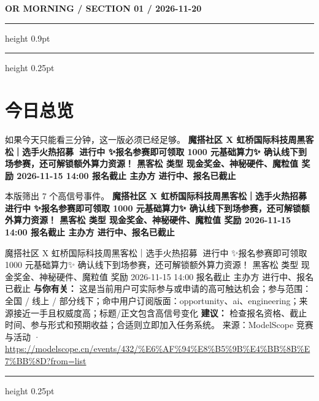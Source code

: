 \documentclass[10.5pt]{ctexart}
\begin{document}
{\small\bfseries OR MORNING / SECTION 01 / 2026-11-20}
\vspace{2mm}
\hrule height 0.9pt
\vspace{1.5mm}
\hrule height 0.25pt
\vspace{4mm}
\section*{今日总览}
{\color{ormuted} 如果今天只能看三分钟，这一版必须已经足够。}
\vspace{2mm}
{\fontsize{25}{29}\selectfont\bfseries 魔搭社区 X 虹桥国际科技周黑客松｜选手火热招募🚀 进行中 ✨报名参赛即可领取 1000 元基础算力✨ 确认线下到场参赛，还可解锁额外算力资源！ 黑客松 类型 现金奖金、神秘硬件、魔粒值 奖励 2026-11-15 14:00 报名截止 主办方 进行中、报名已截止}\par
\vspace{2mm}
{\large 本版筛出 7 个高信号事件。}
\vspace{3mm}
{\Large\bfseries 魔搭社区 X 虹桥国际科技周黑客松｜选手火热招募🚀 进行中 ✨报名参赛即可领取 1000 元基础算力✨ 确认线下到场参赛，还可解锁额外算力资源！ 黑客松 类型 现金奖金、神秘硬件、魔粒值 奖励 2026-11-15 14:00 报名截止 主办方 进行中、报名已截止}\par
魔搭社区 X 虹桥国际科技周黑客松｜选手火热招募🚀 进行中 ✨报名参赛即可领取 1000 元基础算力✨ 确认线下到场参赛，还可解锁额外算力资源！ 黑客松 类型 现金奖金、神秘硬件、魔粒值 奖励 2026-11-15 14:00 报名截止 主办方 进行中、报名已截止
\textbf{与你有关：} 这是当前用户可实际参与或申请的高可触达机会；参与范围：全国 / 线上 / 部分线下；命中用户订阅版面：opportunity、ai、engineering；来源接近一手且权威度高；标题/正文包含高信号变化
\textbf{建议：} 检查报名资格、截止时间、参与形式和预期收益；合适则立即加入任务系统。
{\footnotesize\color{ormuted} 来源：ModelScope 竞赛与活动 · \url{https://modelscope.cn/events/432/%E6%AF%94%E8%B5%9B%E4%BB%8B%E7%BB%8D?from=list}}
\vspace{3mm}
\hrule height 0.25pt
\vspace{3mm}
\end{document}
